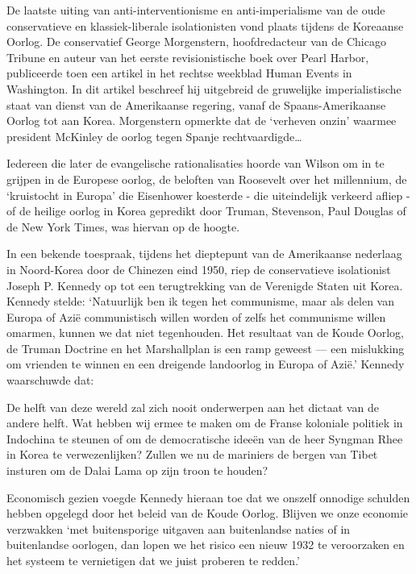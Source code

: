 \documentclass[
  a5paper,
  smalldemyvopaper,10pt,twoside,onecolumn,openright,extrafontsizes,hidelinks]{memoir}
\renewenvironment{quote}%
               {\list{}{\rightmargin=.6cm\leftmargin=.6cm}%
                \itshape \item[]}%
               {\endlist}
\begin{document}
De laatste uiting van anti-interventionisme en anti-imperialisme van de
oude conservatieve en klassiek-liberale isolationisten vond plaats
tijdens de Koreaanse Oorlog. De conservatief George Morgenstern,
hoofdredacteur van de Chicago Tribune en auteur van het eerste
revisionistische boek over Pearl Harbor, publiceerde toen een artikel in
het rechtse weekblad Human Events in Washington. In dit artikel
beschreef hij uitgebreid de gruwelijke imperialistische staat van dienst
van de Amerikaanse regering, vanaf de Spaans-Amerikaanse Oorlog tot aan
Korea. Morgenstern opmerkte dat de `verheven onzin' waarmee president
McKinley de oorlog tegen Spanje rechtvaardigde\ldots{}

\begin{quote}
Iedereen die later de evangelische rationalisaties hoorde van Wilson om
in te grijpen in de Europese oorlog, de beloften van Roosevelt over het
millennium, de `kruistocht in Europa' die Eisenhower koesterde - die
uiteindelijk verkeerd afliep - of de heilige oorlog in Korea gepredikt
door Truman, Stevenson, Paul Douglas of de New York Times, was hiervan
op de hoogte.
\end{quote}

In een bekende toespraak, tijdens het dieptepunt van de Amerikaanse
nederlaag in Noord-Korea door de Chinezen eind 1950, riep de
conservatieve isolationist Joseph P. Kennedy op tot een terugtrekking
van de Verenigde Staten uit Korea. Kennedy stelde: `Natuurlijk ben ik
tegen het communisme, maar als delen van Europa of Azië communistisch
willen worden of zelfs het communisme willen omarmen, kunnen we dat niet
tegenhouden. Het resultaat van de Koude Oorlog, de Truman Doctrine en
het Marshallplan is een ramp geweest --- een mislukking om vrienden te
winnen en een dreigende landoorlog in Europa of Azië.' Kennedy
waarschuwde dat:

\begin{quote}
De helft van deze wereld zal zich nooit onderwerpen aan het dictaat van
de andere helft. Wat hebben wij ermee te maken om de Franse koloniale
politiek in Indochina te steunen of om de democratische ideeën van de
heer Syngman Rhee in Korea te verwezenlijken? Zullen we nu de mariniers
de bergen van Tibet insturen om de Dalai Lama op zijn troon te houden?
\end{quote}

Economisch gezien voegde Kennedy hieraan toe dat we onszelf onnodige
schulden hebben opgelegd door het beleid van de Koude Oorlog. Blijven we
onze economie verzwakken `met buitensporige uitgaven aan buitenlandse
naties of in buitenlandse oorlogen, dan lopen we het risico een nieuw
1932 te veroorzaken en het systeem te vernietigen dat we juist proberen
te redden.'
\end{document}
